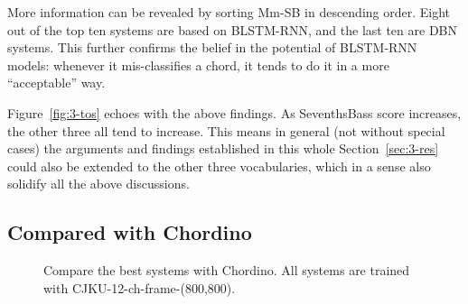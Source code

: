 More information can be revealed by sorting Mm-SB in descending order. Eight out of the top ten systems are based on BLSTM-RNN, and the last ten are DBN systems. This further confirms the belief in the potential of BLSTM-RNN models: whenever it mis-classifies a chord, it tends to do it in a more ``acceptable'' way.

Figure~\ref{fig:3-tos} echoes with the above findings. As SeventhsBass score increases, the other three all tend to increase. This means in general (not without special cases) the arguments and findings established in this whole Section~\ref{sec:3-res} could also be extended to the other three vocabularies, which in a sense also solidify all the above discussions.

\subsection{Compared with Chordino} \label{sec:3-p9}

\begin{figure}[htb]
\centering
{}
\caption{Compare the best systems with Chordino. All systems are trained with CJKU-12-ch-frame-(800,800).}
\label{fig:3-compchordino}
\end{figure}


